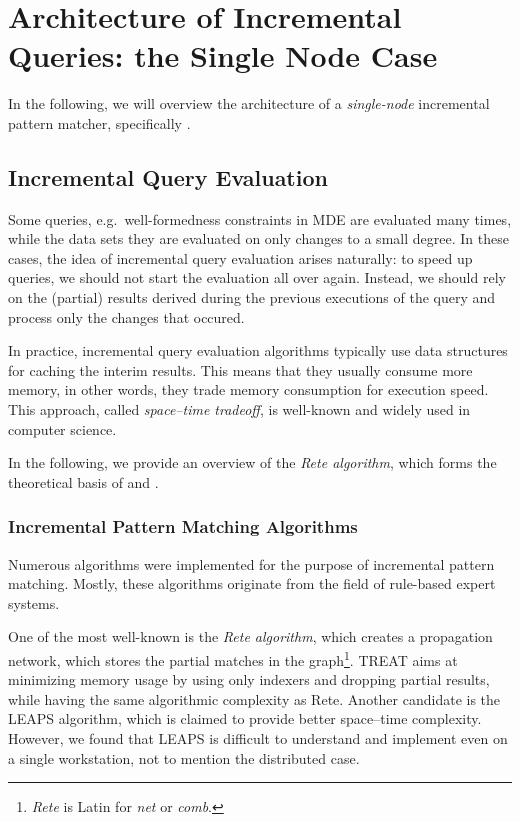 \section{Architecture of Incremental Queries: the Single Node Case}
\label{eiq-architecture}

In the following, we will overview the architecture of a \emph{single-node} incremental pattern matcher, specifically \eiq{}.


\subsection{Incremental Query Evaluation}
\label{rete}

Some queries, e.g.\ well-formedness constraints in MDE are evaluated many times, while the data sets they are evaluated on only changes to a small degree. In these cases, the idea of incremental query evaluation arises naturally: to speed up queries, we should not start the evaluation all over again. Instead, we should rely on the (partial) results derived during the previous executions of the query and process only the changes that occured.
 
In practice, incremental query evaluation algorithms typically use data structures for caching the interim results. This  means that they usually consume more memory, in other words, they trade memory consumption for execution speed. This approach, called \emph{space--time tradeoff}, is well-known and widely used in computer science.

In the following, we provide an overview of the \emph{Rete algorithm}, which forms the theoretical basis of \eiq{} and \iqd{}.

\subsubsection{Incremental Pattern Matching Algorithms}

Numerous algorithms were implemented for the purpose of incremental pattern matching. Mostly, these algorithms originate from the field of rule-based expert systems.

One of the most well-known is the \emph{Rete algorithm}, which creates a propagation network, which stores the partial matches in the graph\footnote{\emph{Rete} is Latin for \emph{net} or \emph{comb}.}. TREAT \cite{Miranker:1991:OPT:627280.627434} aims at minimizing memory usage by using only indexers and dropping partial results, while having the same algorithmic complexity as Rete. Another candidate is the LEAPS \cite{Batory:1994:LA:899216} algorithm, which is claimed to provide better space--time complexity. However, we found that LEAPS is difficult to understand and implement even on a single workstation, not to mention the distributed case. 

